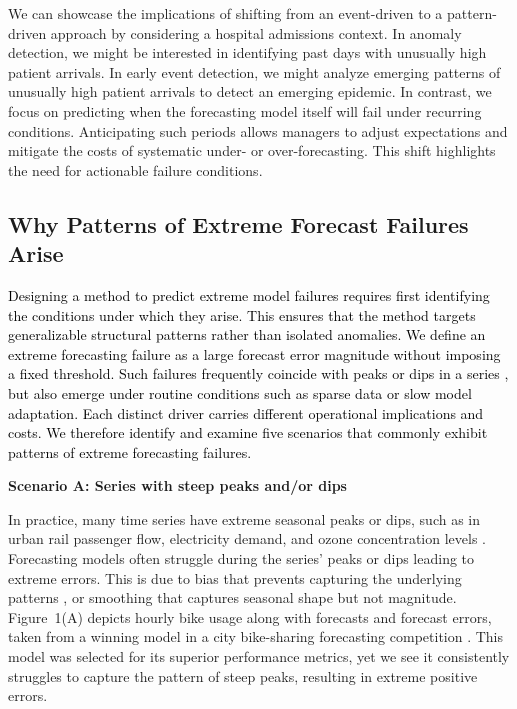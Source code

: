 \documentclass[]{interact}
\theoremstyle{plain}
\theoremstyle{definition}
\theoremstyle{remark}
\newenvironment{scenario}[1]{%
  \par\vspace{1ex}\noindent\textbf{#1}\par\vspace{0.5ex}}{\par}
\newcommand{\matt}[1]{\textcolor{black}{#1}}
\begin{document}
We can showcase the implications of shifting from an event-driven to a pattern-driven
approach by considering a hospital admissions context. In anomaly detection, we might be
interested in identifying past days with unusually high patient arrivals. In early event
detection, we might analyze emerging patterns of unusually high patient arrivals to detect
an emerging epidemic. In contrast, we focus on predicting when the forecasting model itself
will fail under recurring conditions. Anticipating such periods allows managers to adjust
expectations and mitigate the costs of systematic under- or over-forecasting. This shift
highlights the need for actionable failure conditions.

\subsection{Why Patterns of Extreme Forecast Failures Arise}

\matt{Designing a method to predict extreme model failures requires first identifying the
conditions under which they arise. This ensures that the method targets generalizable
structural patterns rather than isolated anomalies. We define an extreme forecasting failure
as a large forecast error magnitude without imposing a fixed threshold. Such failures
frequently coincide with peaks or dips in a series \citep{marvin2022}, but also emerge
under routine conditions such as sparse data or slow model adaptation. Each distinct driver
carries different operational implications and costs. We therefore identify and examine five
scenarios that commonly exhibit patterns of extreme forecasting failures.}

\begin{scenario}{Scenario A: Series with steep peaks and/or dips}
In practice, many time series have extreme seasonal peaks or dips, such as in urban rail
passenger flow, electricity demand, and ozone concentration levels \citep{li2024,
amaraouali2023, marvin2022}. Forecasting models often struggle during the series' peaks or
dips leading to extreme errors. This is due to bias that prevents capturing the underlying
patterns \citep{lin2023}, or smoothing that captures seasonal shape but not magnitude.
Figure~1(A) depicts hourly bike usage along with forecasts and forecast errors, taken from a
winning model in a city bike-sharing forecasting competition \citep{mohit2020}. This model
was selected for its superior performance metrics, yet we see it consistently struggles to
capture the pattern of steep peaks, resulting in extreme positive errors.
\end{scenario}
\end{document}
